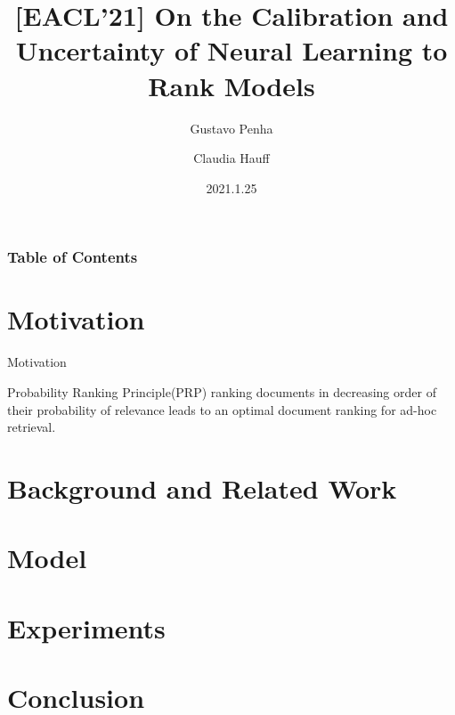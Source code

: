 \documentclass{beamer}
\title[PaperSharing-(EACL'21)LTR]{[EACL'21] On the Calibration and Uncertainty of Neural Learning to Rank Models}
\author[Shengqiang Zhang]{Gustavo Penha \and Claudia Hauff}
\institute[Baidu]{Delft University of Technology, Delft}
\date{2021.1.25}
\begin{document}
\frame{\titlepage}

\begin{frame}
\frametitle{Table of Contents}
\tableofcontents
\end{frame}

\section{Motivation}
\begin{frame}{Motivation}
    \begin{block}{Probability Ranking Principle(PRP)}
    ranking documents in decreasing order of their probability of relevance leads to an optimal document ranking for ad-hoc retrieval.
    \end{block}
\end{frame}
\section{Background and Related Work}

\section{Model}

\section{Experiments}

\section{Conclusion}
\end{document}
